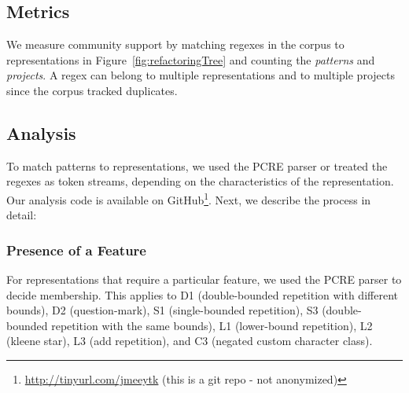 \subsection{Metrics}
\label{sec:communitymetric}
We measure community support by matching regexes in the corpus to  representations in Figure~\ref{fig:refactoringTree} and counting the \emph{patterns} and \emph{projects}.
A regex can belong to multiple representations and to multiple projects since the corpus tracked duplicates. %
%
%






\subsection{Analysis}
\label{communityanalysis}
To match patterns to representations, we used the PCRE parser or treated the regexes as token streams, depending on the characteristics of the representation. Our analysis code is available on GitHub\footnote{\url{http://tinyurl.com/jmeeytk} (this is a git repo - not anonymized)}. Next, we describe the process in detail:

\subsubsection{Presence of a Feature}
For representations that require a particular feature, we used the PCRE parser to decide membership. This applies to D1 (double-bounded repetition with different bounds), D2 (question-mark), S1 (single-bounded repetition), S3 (double-bounded repetition with the same bounds),  L1 (lower-bound repetition), L2 (kleene star), L3  (add repetition), and C3 (negated custom character class).

